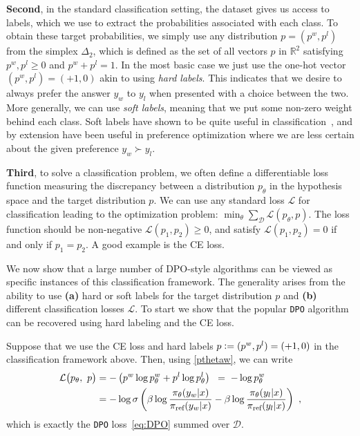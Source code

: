 \textbf{Second}, in the standard classification setting, 
the dataset gives us access to labels, which we use to extract the probabilities associated with each class. To obtain these target probabilities, we simply use any distribution $p=(p^w , p^l)$ from the simplex $\Delta_{2}$, which is defined as the set of all vectors $p$ in $\mathbb{R}^{2}$ satisfying $p^w , p^l \geq 0$ and $p^w + p^l =1$. In the most basic case we just use the one-hot vector $(p^w , p^l) = (+1 , 0)$ akin to using {\em hard labels}. This indicates that we desire to always prefer the answer $y_w$ to $y_l$ when presented with a choice between the two. More generally, we can use {\em soft labels}, meaning that we put some non-zero weight behind each class. Soft labels have shown to be quite useful in %
classification~\cite{softLabels}, and by extension have been useful in preference optimization where we are less certain about the given preference $y_w \succ y_l$.

\textbf{Third}, to solve a classification problem, we often define a differentiable loss function measuring the discrepancy between a distribution $p_{\theta}$ in the hypothesis space and the target distribution $p$. We can use any standard loss $\mathcal L$ for classification leading to the optimization problem: $\min_{\theta} \sum_{\mathcal{D}}{\mathcal L}(p_{\theta},p)$. The loss function should be non-negative $\mathcal{L}(p_1, p_2) \geq 0$, and satisfy $\mathcal L(p_1 , p_2)= 0$ if and only if $p_1 = p_2$. A good example is the CE loss.

We now show that a large number of DPO-style algorithms can be viewed as specific instances of this classification framework. The generality arises from the ability to use {\bf (a)} hard or soft labels for the target distribution $p$ and {\bf (b)} different classification losses $\mathcal{L}$. To start we show that the popular \texttt{DPO} algorithm~\cite{DPO} can be recovered using hard labeling and the CE loss.

\begin{remark}
Suppose that we use the CE loss and hard labels $p \mathrel{\mathop:}= (p^{w} , p^{l}) = (+1 , 0)$ in the classification framework above. Then, using \eqref{pthetaw}, we can write
%
\begin{align*}
{\mathcal L}\big(p_{\theta},\ p\big) &= -\left(p^w \log p^{w}_{\theta} + p^l \log p^{l}_{\theta}\right) \;\; = \; -\log p^{w}_{\theta} \\ %
&= -\log \sigma\left(\beta\log \frac{\pi_{\theta}(y_w | x)}{\piRef(y_w | x)} - \beta\log \frac{\pi_{\theta}(y_l |x)}{\piRef(y_l | x)}\right)\ ,
\end{align*}
%
which is exactly the \texttt{DPO} loss~\eqref{eq:DPO} summed over $\mathcal{D}$.
\end{remark}

